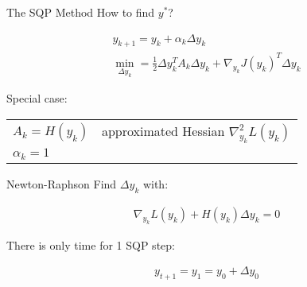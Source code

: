 \begin{frame}{The SQP Method}
How to find $y^*$?
\begin{block}{ }
\begin{gather*}
y_{k+1} = y_{k} + \alpha_{k} \Delta y_{k}  \\ 
\min_{\Delta y_k} = \frac{1}{2} \Delta y_k^T A_k \Delta y_k + \nabla_{y_k} J(y_k)^T \Delta y_k
\end{gather*} \vspace{.1ex}
\end{block}
\vspace{1ex}
Special case: \\
\vspace{1ex}
\begin{tabular}{l l}
$ A_{k} = H(y_k)$ & approximated Hessian $\nabla^{2}_{y_k} L(y_k)$ \vspace{1ex} \\
$\alpha_k = 1$ & 
\end{tabular}
\end{frame}

\begin{frame}{Newton-Raphson}
Find $\Delta y_k$ with:
\begin{block}{}
\begin{gather*}
\nabla_{y_k} L(y_{k}) + H(y_{k}) \Delta y_{k} = 0
\end{gather*} \vspace{.1ex}
\end{block}
There is only time for 1 SQP step:
\begin{block}{ }
\begin{gather*}
y_{t+1} = y_1 = y_0 + \Delta y_0 \\
\end{gather*}
\end{block}
\end{frame}

